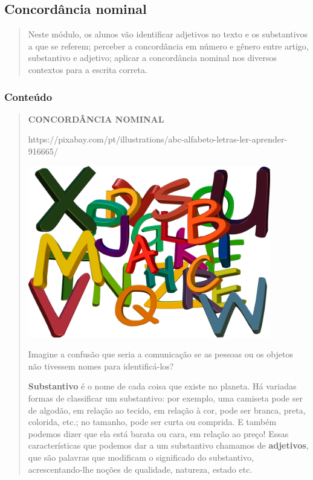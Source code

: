 \begin{itemize}
{{{\begin{itemize}
\begin{itemize}
\begin{itemize}
\chapter{Concordância nominal}

\begin{quote}
Neste módulo, os alunos vão identificar adjetivos no texto e os
substantivos a que se referem; perceber a concordância em número e
gênero entre artigo, substantivo e adjetivo; aplicar a concordância
nominal nos diversos contextos para a escrita correta.
\end{quote}

\subsection{Conteúdo}\label{conteuxfado-6}

\begin{quote}
\textbf{CONCORDÂNCIA NOMINAL}

https://pixabay.com/pt/illustrations/abc-alfabeto-letras-ler-aprender-916665/

\includegraphics[width=4.16597in,height=2.95939in]{media/image23.png}

Imagine a confusão que seria a comunicação se as pessoas ou os objetos
não tivessem nomes para identificá-los?~

\textbf{Substantivo} é o nome de cada coisa que existe no planeta. Há
variadas formas de classificar um substantivo: por exemplo, uma camiseta
pode ser de algodão, em relação ao tecido, em relação à cor, pode ser
branca, preta, colorida, etc.; no tamanho, pode ser curta ou comprida. E
também podemos dizer que ela está barata ou cara, em relação ao preço!
Essas características que podemos dar a um substantivo chamamos de
\textbf{adjetivos}, que são palavras que modificam o significado do
substantivo, acrescentando-lhe noções de qualidade, natureza, estado
etc.


\end{quote}
\end{itemize}
\end{itemize}
\end{itemize}}}}
\end{itemize}
